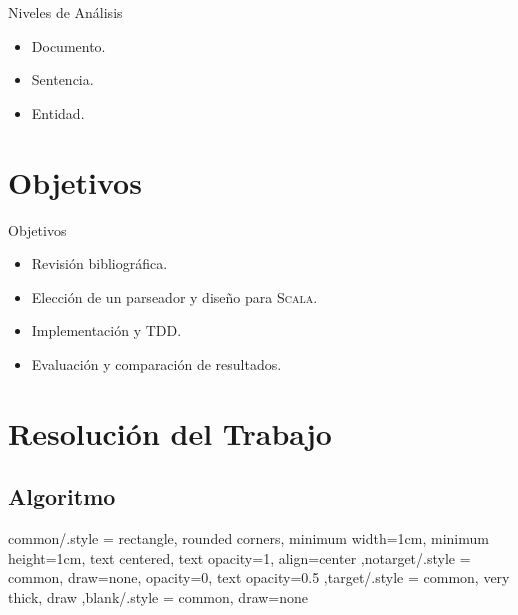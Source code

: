\documentclass{beamer}
\begin{document}
\begin{frame}{Niveles de Análisis}
  \begin{itemize}
  \item Documento.
  \item Sentencia.
  \item Entidad.
  \end{itemize}
\end{frame}

\section{Objetivos}
\begin{frame}{Objetivos}
  \begin{itemize}
  \item Revisión bibliográfica.
  \item Elección de un parseador y diseño para \textsc{Scala}.
  \item Implementación y TDD.
  \item Evaluación y comparación de resultados.
  \end{itemize}
\end{frame}

\section{Resolución del Trabajo}

\subsection{Algoritmo}

\tikzset
{common/.style =
  {rectangle, rounded corners, minimum width=1cm, minimum height=1cm,
    text centered, text opacity=1, align=center
  }
  ,notarget/.style = {common, draw=none, opacity=0, text opacity=0.5}
  ,target/.style   = {common, very thick, draw}
  ,blank/.style    = {common, draw=none}
}
\end{document}
